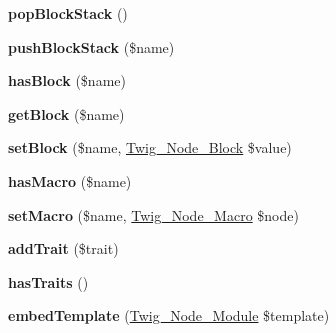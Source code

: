 \begin{DoxyCompactItemize}
\item 
\hypertarget{class_twig___parser_a530c1e50ce33798359120714a799f14f}{}{\bfseries pop\+Block\+Stack} ()\label{class_twig___parser_a530c1e50ce33798359120714a799f14f}

\item 
\hypertarget{class_twig___parser_a20b3dae4ef5bc44a48cc8b4f077dc5be}{}{\bfseries push\+Block\+Stack} (\$name)\label{class_twig___parser_a20b3dae4ef5bc44a48cc8b4f077dc5be}

\item 
\hypertarget{class_twig___parser_ade38e8b97bc678e012017eaec7594585}{}{\bfseries has\+Block} (\$name)\label{class_twig___parser_ade38e8b97bc678e012017eaec7594585}

\item 
\hypertarget{class_twig___parser_a4c2f3ed0733b1d16c6b9d1d13898574f}{}{\bfseries get\+Block} (\$name)\label{class_twig___parser_a4c2f3ed0733b1d16c6b9d1d13898574f}

\item 
\hypertarget{class_twig___parser_a09f53c68be0c2cc0d11472667c714367}{}{\bfseries set\+Block} (\$name, \hyperlink{class_twig___node___block}{Twig\+\_\+\+Node\+\_\+\+Block} \$value)\label{class_twig___parser_a09f53c68be0c2cc0d11472667c714367}

\item 
\hypertarget{class_twig___parser_a4745b963bc3fbb604343ebf1e68088b8}{}{\bfseries has\+Macro} (\$name)\label{class_twig___parser_a4745b963bc3fbb604343ebf1e68088b8}

\item 
\hypertarget{class_twig___parser_aa78fc6cb476b91da99f607355bc983ce}{}{\bfseries set\+Macro} (\$name, \hyperlink{class_twig___node___macro}{Twig\+\_\+\+Node\+\_\+\+Macro} \$node)\label{class_twig___parser_aa78fc6cb476b91da99f607355bc983ce}

\item 
\hypertarget{class_twig___parser_a232cb22c4f3dc89dc727567021036770}{}{\bfseries add\+Trait} (\$trait)\label{class_twig___parser_a232cb22c4f3dc89dc727567021036770}

\item 
\hypertarget{class_twig___parser_ad52a88405ecca93c8a0bea73b0539348}{}{\bfseries has\+Traits} ()\label{class_twig___parser_ad52a88405ecca93c8a0bea73b0539348}

\item 
\hypertarget{class_twig___parser_af8d7eaf0c7174a199d3caa4bc2f5af4d}{}{\bfseries embed\+Template} (\hyperlink{class_twig___node___module}{Twig\+\_\+\+Node\+\_\+\+Module} \$template)\label{class_twig___parser_af8d7eaf0c7174a199d3caa4bc2f5af4d}


\end{DoxyCompactItemize}
